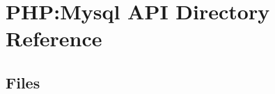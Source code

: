 \section{P\+HP\+:Mysql A\+PI Directory Reference}
\label{dir_3bf7f5dafd18d200ac16163d1296230f}
\subsection*{Files}
\begin{DoxyCompactItemize}
\end{DoxyCompactItemize}
